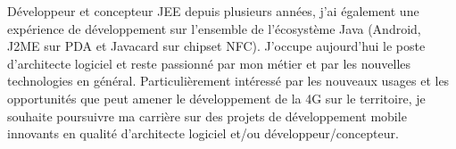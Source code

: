 \par{
	Développeur et concepteur JEE depuis plusieurs années, j'ai également une expérience de développement sur l'ensemble de l'écosystème Java (Android, J2ME sur PDA et Javacard sur chipset NFC). J'occupe aujourd'hui le poste d'architecte logiciel et reste passionné par mon métier et par les nouvelles technologies en général. Particulièrement intéressé par les nouveaux usages  et les opportunités que peut amener le développement de la 4G sur le territoire, je souhaite poursuivre ma carrière sur des projets de développement mobile innovants en qualité d'architecte logiciel et/ou développeur/concepteur.
}
